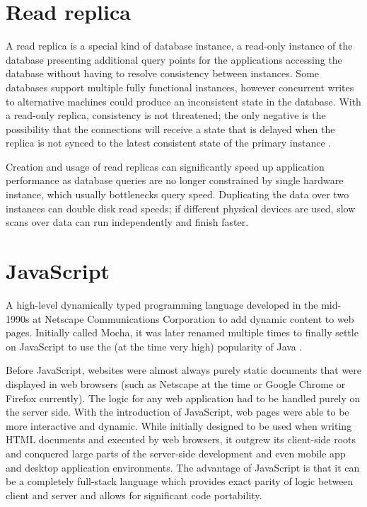 \section*{Read replica}
A read replica is a special kind of database instance, a read-only instance of
the database presenting additional query points for the applications accessing
the database without having to resolve consistency between instances. Some
databases support multiple fully functional instances, however concurrent writes
to alternative machines could produce an inconsistent state in the database.
With a read-only replica, consistency is not threatened; the only negative is
the possibility that the connections will receive a state that is delayed when
the replica is not synced to the latest consistent state of the primary instance
\cite{postgres-availability}.

Creation and usage of read replicas can significantly speed up application
performance as database queries are no longer constrained by single hardware
instance, which usually bottlenecks query speed. Duplicating the data over two
instances can double disk read speeds; if different physical devices are used,
slow scans over data can run independently and finish faster.


\section*{JavaScript}
A high-level dynamically typed programming language developed in the mid-1990s
at Netscape Communications Corporation to add dynamic content to web pages.
Initially called Mocha, it was later renamed multiple times to finally settle on
JavaScript to use the (at the time very high) popularity of Java
\cite{auth0JavascriptHistory}.

Before JavaScript, websites were almost always purely static documents that were
displayed in web browsers (such as Netscape at the time or Google Chrome or
Firefox currently). The logic for any web application had to be handled purely
on the server side. With the introduction of JavaScript, web pages were able to
be more interactive and dynamic. While initially designed to be used when
writing HTML documents and executed by web browsers, it outgrew its client-side
roots and conquered large parts of the server-side development and even mobile
app and desktop application environments. The advantage of JavaScript is that it
can be a completely full-stack language which provides exact parity of logic
between client and server and allows for significant code portability.

